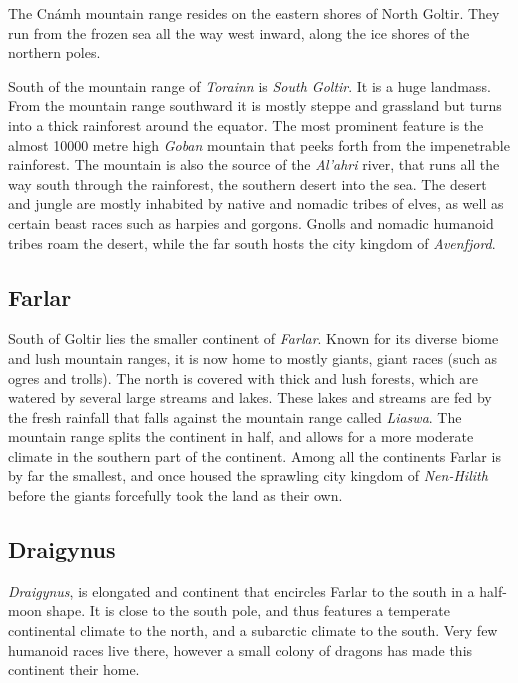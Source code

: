 The Cnámh mountain range resides on the eastern shores of North Goltir. They
run from the frozen sea all the way west inward, along the ice shores of the
northern poles.

South of the mountain range of \emph{Torainn} is \emph{South Goltir}. It is
a huge landmass. From the mountain range southward it is mostly steppe and
grassland but turns into a thick rainforest around the equator. The most
prominent feature is the almost 10000 metre high \emph{Goban} mountain that
peeks forth from the impenetrable rainforest. The mountain is also the source
of the \emph{Al'ahri} river, that runs all the way south through the
rainforest, the southern desert into the sea. The desert and jungle are mostly
inhabited by native and nomadic tribes of elves, as well as certain beast
races such as harpies and gorgons. Gnolls and nomadic humanoid tribes roam the
desert, while the far south hosts the city kingdom of \emph{Avenfjord}.

\subsection{Farlar}
\label{sec:Farlar}

South of Goltir lies the smaller continent of \emph{Farlar}. Known for its
diverse biome and lush mountain ranges, it is now home to mostly giants, giant
races (such as ogres and trolls). The north is covered with thick and lush
forests, which are watered by several large streams and lakes. These lakes
and streams are fed by the fresh rainfall that falls against the mountain range
called \emph{Liaswa}. The mountain range splits the continent in half, and
allows for a more moderate climate in the southern part of the continent. Among
all the continents Farlar is by far the smallest, and once housed the sprawling
city kingdom of \emph{Nen-Hilith} before the giants forcefully took the land as
their own.

\subsection{Draigynus}
\label{sec:Draigynus}

\emph{Draigynus}, is elongated and continent that encircles Farlar to the
south in a half-moon shape. It is close to the south pole, and thus features a
temperate continental climate to the north, and a subarctic climate to the
south. Very few humanoid races live there, however a small colony of dragons
has made this continent their home.

